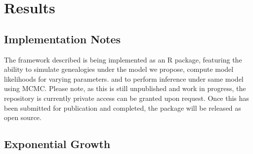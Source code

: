 \documentclass{ieeeaccess}
\theoremstyle{definition}
\begin{document}
\section{Results}
\subsection{Implementation Notes}
The framework described is being implemented as an R package, featuring the ability to simulate genealogies under the model we propose, compute model likelihoods for varying parameters. and to perform inference under same model using MCMC. Please note, as this is still unpublished and work in progress, the repository is currently private access can be granted upon request. Once this has been submitted for publication and completed, the package will be released as open source.
\subsection{Exponential Growth}
\end{document}
